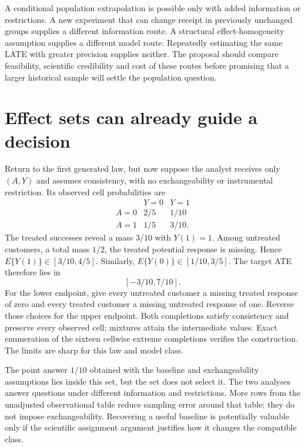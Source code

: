 A conditional population extrapolation is possible only with
added information or restrictions. A new experiment that can
change receipt in previously unchanged groups supplies a
different information route. A structural effect-homogeneity
assumption supplies a different model route. Repeatedly
estimating the same LATE with greater precision supplies
neither. The proposal should compare feasibility, scientific
credibility and cost of these routes before promising that a
larger historical sample will settle the population question.

\section{Effect sets can already guide a decision}
\label{exec17:s3-bounds}

Return to the first generated law, but now suppose the analyst
receives only $(A,Y)$ and assumes consistency, with no
exchangeability or instrumental restriction. Its observed
cell probabilities are
\[
\begin{array}{c|cc}
 &Y=0&Y=1\\ \hline
 A=0&2/5&1/10\\
 A=1&1/5&3/10 .
\end{array}
\]
The treated successes reveal a mass $3/10$ with $Y(1)=1$.
Among untreated customers, a total mass $1/2$, the treated
potential response is missing. Hence
$E\{Y(1)\}\in[3/10,4/5]$. Similarly,
$E\{Y(0)\}\in[1/10,3/5]$.
The target ATE therefore lies in
\[
 [-3/10,7/10].
\]
For the lower endpoint, give every untreated customer a
missing treated response of zero and every treated customer
a missing untreated response of one. Reverse those choices
for the upper endpoint. Both completions satisfy consistency
and preserve every observed cell; mixtures attain the
intermediate values. Exact enumeration of the sixteen
cellwise extreme completions verifies the construction.
The limits are sharp for this law and model
class.~\citep{exec17_s3_exact}

The point answer $1/10$ obtained with the baseline and
exchangeability assumptions lies inside this set, but the
set does not select it. The two analyses answer questions
under different information and restrictions. More rows
from the unadjusted observational table reduce sampling
error around that table; they do not impose exchangeability.
Recovering a useful baseline is potentially valuable only
if the scientific assignment argument justifies how it
changes the compatible class.

